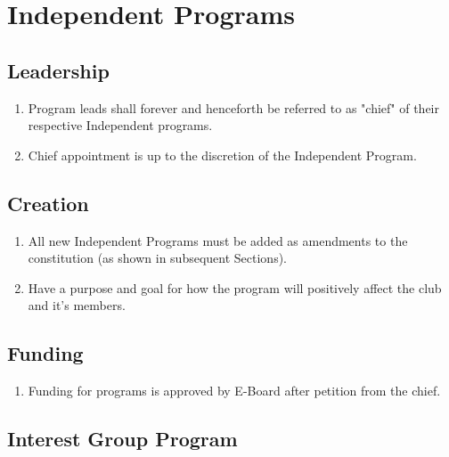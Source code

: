 
\section{Independent Programs}

\subsection{Leadership}

\begin{enumerate}
  \item Program leads shall forever and henceforth be referred to as "chief" of
    their respective Independent programs.
  \item Chief appointment is up to the discretion of the Independent Program.
\end{enumerate}

\subsection{Creation}

\begin{enumerate}
  \item All new Independent Programs must be added as amendments to the
    constitution (as shown in subsequent Sections).
  \item Have a purpose and goal for how the program will positively affect the
    club and it’s members.
\end{enumerate}

\subsection{Funding}

\begin{enumerate}
  \item Funding for programs is approved by E-Board after petition from the
    chief.
\end{enumerate}

\subsection{Interest Group Program}

